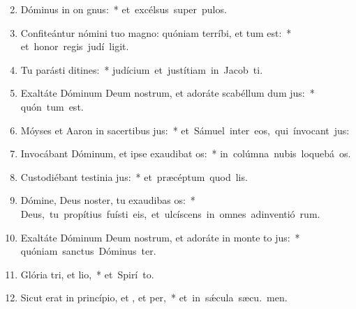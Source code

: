 \begin{flushleft}
\begin{enumerate}[leftmargin=*]
\setcounter{enumi}{1}

\item Dóminus in on gnus:~* \mbox{et excélsus super  pulos.}

\item Confiteántur nómini tuo magno: quóniam terríbi, et tum est:~* \mbox{et honor regis judí ligit.}

\item Tu parásti ditines:~* \mbox{judícium et justítiam in Jacob  ti.}

\item Exaltáte Dóminum Deum nostrum, et adoráte scabéllum dum jus:~* \mbox{quón tum est.}

\item Móyses et Aaron in sacertibus jus:~* \mbox{et Sámuel inter eos, qui ínvocant  jus:}

\item Invocábant Dóminum, et ipse exaudibat os:~* \mbox{in colúmna nubis loquebá  os.}

\item Custodiébant testinia jus:~* \mbox{et præcéptum quod  lis.}

\item Dómine, Deus noster, tu exaudibas os:~* \mbox{Deus, tu propítius fuísti eis, et ulcíscens in omnes adinventió rum.}

\item Exaltáte Dóminum Deum nostrum, et adoráte in monte to jus:~* \mbox{quóniam sanctus Dóminus  ter.}

\item Glória tri, et lio,~* \mbox{et Spirí to.}

\item Sicut erat in princípio, et , et per,~* \mbox{et in sǽcula sæcu. men.}

\end{enumerate}
\end{flushleft}